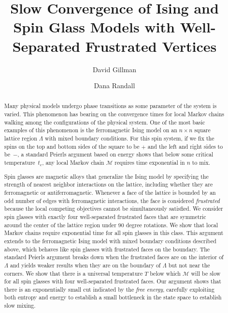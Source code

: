 \documentclass[letterpaper,english,numberwithinsect]{amsart}
\title[Slow Convergence of Spin Glass Models]{Slow Convergence of Ising and Spin Glass Models with Well-Separated Frustrated Vertices}
\author{David Gillman}
\author{Dana Randall}
\begin{document}
\date{}
\thispagestyle{empty}

\begin{abstract}
Many physical models undergo phase transitions as some parameter of the system is varied. This phenomenon has bearing on the convergence times for local Markov chains walking among the configurations of the physical system.  One of the most basic examples of this phenomenon is the ferromagnetic Ising model on an $n\times n$ square lattice region $\Lambda$ with mixed boundary conditions. For this spin system, if we fix the spins on the top and bottom sides of the square to be $+$ and the left and right sides to be~$-$, a standard Peierls argument based on energy shows that below some critical temperature~$t_c$, any local Markov chain $\mathcal{M}$ requires time exponential in $n$ to mix. 

Spin glasses are magnetic alloys that generalize the Ising model by specifying the strength of nearest neighbor interactions on the lattice, including whether they are ferromagnetic or antiferromagnetic.  Whenever a face of the lattice is bounded by an odd number of edges with ferromagnetic interactions, the face is considered {\it frustrated} because the local competing objectives cannot be simultaneously satisfied.  We consider spin glasses with 
exactly four well-separated frustrated faces that 
are symmetric around the center of the lattice region under $90$ degree rotations.
We show that local Markov chains require exponential time for all spin glasses in this class.  This argument extends to the ferromagnetic Ising model with mixed boundary conditions described above, which behaves like spin glasses with frustrated faces on the boundary. The standard Peierls argument breaks down when the frustrated faces are on the interior of $\Lambda$ 
and yields weaker results when they are on the boundary of $\Lambda$ but not near the corners.  
We show that there is a universal temperature $T$ below which $\mathcal{M}$ will be slow for all spin glasses with four well-separated frustrated faces. Our argument shows that there is an exponentially small cut indicated by the {\it free energy}, carefully exploiting both  entropy and  energy to establish a small bottleneck in the state space to establish slow mixing.  

\end{abstract} 

\maketitle
\end{document}
